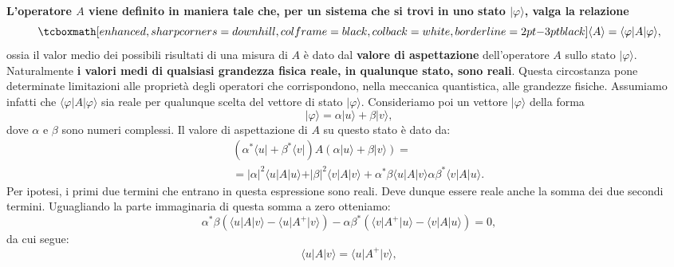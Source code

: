 \documentclass[a4paper,12pt,oneside]{book}
\begin{document}
\textbf{L'operatore $A$ viene definito in maniera tale che, per un sistema che si trovi in uno stato $\vert \varphi \rangle $, valga la relazione}
	\begin{equation}
		\tcboxmath[enhanced, sharp corners=downhill, colframe=black, colback=white, borderline={2pt}{-3pt}{black}]{
			\langle A \rangle = \langle \varphi \vert A \vert \varphi \rangle,
			}
	\end{equation}
ossia il valor medio dei possibili risultati di una misura di $A$ è dato dal \textbf{valore di aspettazione} dell'operatore $A$ sullo stato $\vert \varphi \rangle$.\\

Naturalmente \textbf{i valori medi di qualsiasi grandezza fisica reale, in qualunque stato, sono reali}. Questa circostanza pone determinate limitazioni alle proprietà degli operatori che corrispondono, nella meccanica quantistica, alle grandezze fisiche. Assumiamo infatti che $\langle \varphi \vert A \vert \varphi \rangle$ sia reale per qualunque scelta del vettore di stato $\vert \varphi \rangle$. Consideriamo poi un vettore $\vert \varphi \rangle$ della forma
	\begin{equation}
		\vert \varphi \rangle = \alpha \vert u \rangle + \beta \vert v \rangle,
	\end{equation}
dove $\alpha$ e $\beta$ sono numeri complessi. Il valore di aspettazione di $A$ su questo stato è dato da:
	\begin{eqnarray}
		& &\left( \alpha ^* \langle u \vert + \beta ^* \langle v \vert \right) A \left(\alpha \vert u \rangle + \beta \vert v \rangle \right) = \nonumber \\
		& &=\vert \alpha \vert ^2 \langle u \vert A \vert u \rangle + \vert \beta \vert ^2 \langle v \vert A \vert v \rangle + \alpha ^* \beta \langle u \vert A \vert v \rangle \alpha  \beta ^* \langle v \vert A \vert u \rangle.
	\end{eqnarray}
Per ipotesi, i primi due termini che entrano in questa espressione sono reali. Deve dunque essere reale anche la somma dei due secondi termini. Uguagliando la parte immaginaria di questa somma a zero otteniamo:
	\begin{equation}
		\label{eq:cap4_1}
		\alpha ^* \beta \left(\langle u \vert A \vert v \rangle -\langle u \vert A^{+} \vert v \rangle \right)-  \alpha  \beta ^* \left( \langle v \vert A^{+} \vert u \rangle -\langle v \vert A \vert u \rangle \right) =0, 
	\end{equation}
da cui segue:
	\begin{equation}
		\langle u \vert A \vert v \rangle = \langle u \vert A^{+} \vert v \rangle ,
	\end{equation}
\end{document}
